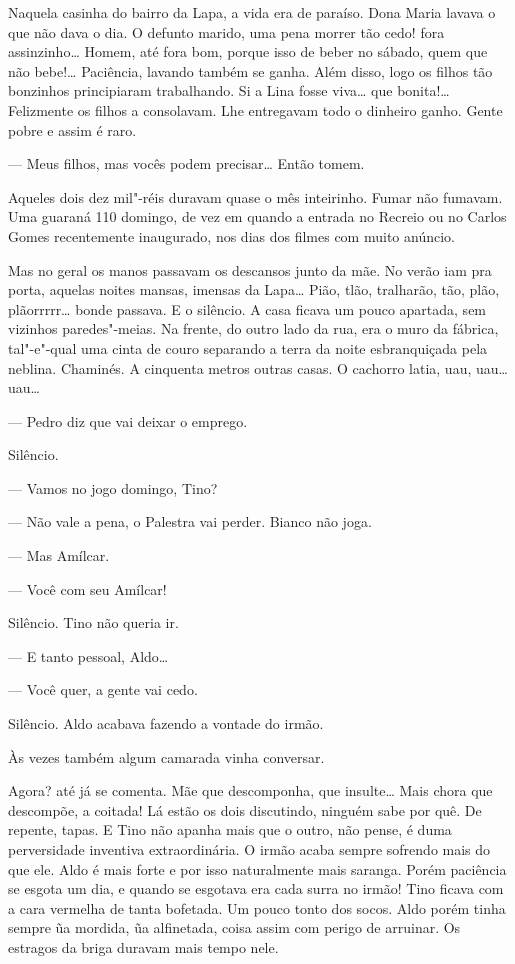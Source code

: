 Naquela casinha do bairro da Lapa, a vida era de paraíso. Dona Maria
lavava o que não dava o dia. O defunto marido, uma pena morrer tão cedo!
fora assinzinho\ldots{} Homem, até fora bom, porque isso de beber no sábado,
quem que não bebe!\ldots{} Paciência, lavando também se ganha. Além disso,
logo os filhos tão bonzinhos principiaram trabalhando. Si a Lina fosse
viva\ldots{} que bonita!\ldots{} Felizmente os filhos a consolavam. Lhe entregavam
todo o dinheiro ganho. Gente pobre e assim é raro.

--- Meus filhos, mas vocês podem precisar\ldots{} Então tomem.

Aqueles dois dez mil"-réis duravam quase o mês inteirinho. Fumar não
fumavam. Uma guaraná 110 domingo, de vez em quando a entrada no Recreio
ou no Carlos Gomes recentemente inaugurado, nos dias dos filmes com
muito anúncio.

Mas no geral os manos passavam os descansos junto da mãe. No verão iam
pra porta, aquelas noites mansas, imensas da Lapa\ldots{} Pião, tlão,
tralharão, tão, plão, plãorrrrr\ldots{} bonde passava. E o silêncio. A casa
ficava um pouco apartada, sem vizinhos paredes"-meias. Na frente, do
outro lado da rua, era o muro da fábrica, tal"-e"-qual uma cinta de couro
separando a terra da noite esbranquiçada pela neblina. Chaminés. A
cinquenta metros outras casas. O cachorro latia, uau, uau\ldots{} uau\ldots{}

--- Pedro diz que vai deixar o emprego.

Silêncio.

--- Vamos no jogo domingo, Tino?

--- Não vale a pena, o Palestra vai perder. Bianco não joga.

--- Mas Amílcar.

--- Você com seu Amílcar!

Silêncio. Tino não queria ir.

--- E tanto pessoal, Aldo\ldots{}

--- Você quer, a gente vai cedo.

Silêncio. Aldo acabava fazendo a vontade do irmão.

Às vezes também algum camarada vinha conversar. 

Agora? até já se comenta. Mãe que descomponha, que insulte\ldots{} Mais chora
que descompõe, a coitada! Lá estão os dois discutindo, ninguém sabe por
quê. De repente, tapas. E Tino não apanha mais que o outro, não pense, é
duma perversidade inventiva extraordinária. O irmão acaba sempre
sofrendo mais do que ele. Aldo é mais forte e por isso naturalmente mais
saranga. Porém paciência se esgota um dia, e quando se esgotava era cada
surra no irmão! Tino ficava com a cara vermelha de tanta bofetada. Um
pouco tonto dos socos. Aldo porém tinha sempre ũa mordida, ũa
alfinetada, coisa assim com perigo de arruinar. Os estragos da briga
duravam mais tempo nele.

